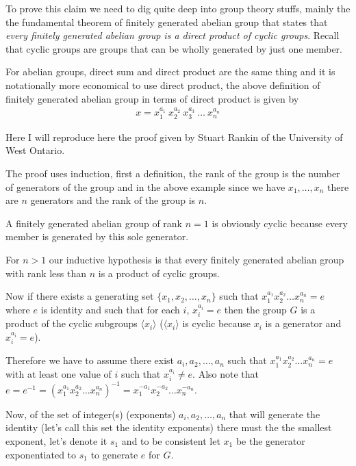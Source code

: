 \documentclass[aps,preprint,preprintnumbers,nofootinbib,showpacs,prd]{revtex4-1}
\newcommand{\nbea}{\begin{eqnarray*}}
\newcommand{\neea}{\end{eqnarray*}}
\begin{document}
To prove this claim we need to dig quite deep into group theory stuffs, mainly the the fundamental theorem of finitely generated abelian group that states that {\it every finitely generated abelian group is a direct product of cyclic groups}. Recall that cyclic groups are groups that can be wholly generated by just one member.

For abelian groups, direct sum and direct product are the same thing and it is notationally more economical to use direct product, the above definition of finitely generated abelian group in terms of direct product is given by
%
\nbea
x = x_1^{a_1} ~ x_2^{a_2} ~ x_3^{a_3} ~ \ldots ~ x_n^{a_n}
\neea
% 

Here I will reproduce here the proof given by Stuart Rankin of the University of West Ontario.

The proof uses induction, first  a definition, the rank of the group is the number of generators of the group and in the above example since we have $x_1, \ldots, x_n$ there are $n$ generators and the rank of the group is $n$.

A finitely generated abelian group of rank $n=1$ is obviously cyclic because every member is generated by this sole generator.

For $n>1$ our inductive hypothesis is that every finitely generated abelian group with rank less than $n$ is a product of cyclic groups.

Now if there exists a generating set $\{x_1, x_2, \dots, x_n\}$ such that $x_1^{a_1} x_2^{a_2} \ldots x_n^{a_n} = e$ where $e$ is identity and such that for each $i$, $x_i^{a_i} = e$ then the group $G$ is a product of the cyclic subgroups $\langle x_i \rangle$ ($\langle x_i \rangle$ is cyclic because $x_i$ is a generator and $x_i^{a_i} = e$).

Therefore we have to assume there exist $a_i, a_2, \dots, a_n$ such that $x_1^{a_1} x_2^{a_2} \ldots x_n^{a_n} = e$ with at least one value of $i$ such that $x_i^{a_i} \neq e$. Also note that $e = e^{-1} = (x_1^{a_1} x_2^{a_2} \ldots x_n^{a_n})^{-1} = x_1^{-a_1} x_2^{-a_2} \ldots x_n^{-a_n}$.

Now, of the set of integer(s) (exponents) $a_i, a_2, \dots, a_n$ that will generate the identity (let's call this set the identity exponents) there must the the smallest exponent, let's denote it $s_1$ and to be consistent let $x_1$ be the generator exponentiated to $s_1$ to generate $e$ for $G$.
\end{document}
